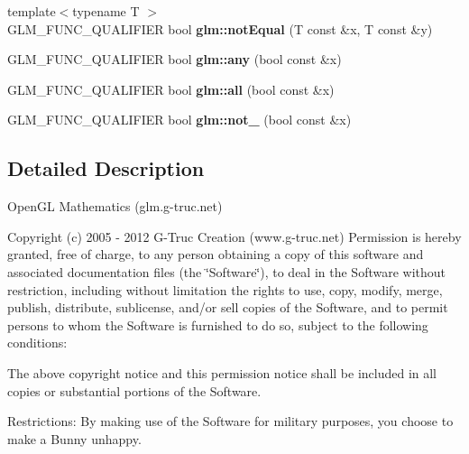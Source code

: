 \begin{DoxyCompactItemize}
\item 
\hypertarget{namespaceglm_ab4ee9100dc2b4e41ef91ff6898f979e2}{{\footnotesize template$<$typename T $>$ }\\G\-L\-M\-\_\-\-F\-U\-N\-C\-\_\-\-Q\-U\-A\-L\-I\-F\-I\-E\-R bool {\bfseries glm\-::not\-Equal} (T const \&x, T const \&y)}\label{namespaceglm_ab4ee9100dc2b4e41ef91ff6898f979e2}

\item 
\hypertarget{namespaceglm_ad41a7e46efe59ecfa701a0d561b7e8fa}{G\-L\-M\-\_\-\-F\-U\-N\-C\-\_\-\-Q\-U\-A\-L\-I\-F\-I\-E\-R bool {\bfseries glm\-::any} (bool const \&x)}\label{namespaceglm_ad41a7e46efe59ecfa701a0d561b7e8fa}

\item 
\hypertarget{namespaceglm_a55c4531f4a0de48f87a20702d96d4289}{G\-L\-M\-\_\-\-F\-U\-N\-C\-\_\-\-Q\-U\-A\-L\-I\-F\-I\-E\-R bool {\bfseries glm\-::all} (bool const \&x)}\label{namespaceglm_a55c4531f4a0de48f87a20702d96d4289}

\item 
\hypertarget{namespaceglm_a081b70b3c919d22f18bb04e6f9c3b7ca}{G\-L\-M\-\_\-\-F\-U\-N\-C\-\_\-\-Q\-U\-A\-L\-I\-F\-I\-E\-R bool {\bfseries glm\-::not\-\_\-} (bool const \&x)}\label{namespaceglm_a081b70b3c919d22f18bb04e6f9c3b7ca}

\end{DoxyCompactItemize}


\subsection{Detailed Description}
Open\-G\-L Mathematics (glm.\-g-\/truc.\-net)

Copyright (c) 2005 -\/ 2012 G-\/\-Truc Creation (www.\-g-\/truc.\-net) Permission is hereby granted, free of charge, to any person obtaining a copy of this software and associated documentation files (the \char`\"{}\-Software\char`\"{}), to deal in the Software without restriction, including without limitation the rights to use, copy, modify, merge, publish, distribute, sublicense, and/or sell copies of the Software, and to permit persons to whom the Software is furnished to do so, subject to the following conditions\-:

The above copyright notice and this permission notice shall be included in all copies or substantial portions of the Software.

Restrictions\-: By making use of the Software for military purposes, you choose to make a Bunny unhappy.

